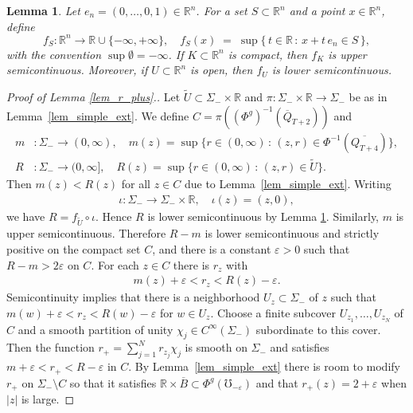 \documentclass[11pt,letterpaper]{amsart}
\newtheorem{Lemma}[Theorem]{Lemma}
\theoremstyle{definition}
\numberwithin{equation}{section}
\newcommand{\ol}[1]{\overline{#1}}
\newcommand{\eps}{\varepsilon}
\def\R{\mathbb R}
\def\mid{\,:\,}
\begin{document}
\begin{Lemma}\label{lem_sc}
Let $e_n = (0, \ldots, 0, 1) \in \mathbb{R}^n$.
For a set $S \subset \mathbb{R}^n$ and a point $x \in \mathbb{R}^n$, define
\[
f_S : \mathbb{R}^n \to \mathbb{R} \cup \{-\infty, +\infty\},
\quad
f_S(x) \;=\; \sup \{\, t \in \mathbb{R} \mid x + t\,e_n \in S \,\},
\]
with the convention $\sup \emptyset = -\infty$.
If $K \subset \mathbb{R}^n$ is compact, then $f_K$ is upper semicontinuous. Moreover, if $U \subset \mathbb{R}^n$ is open, then $f_U$ is lower semicontinuous.
\end{Lemma}
\begin{proof}[Proof of Lemma \ref{lem_r_plus}.]
Let $\tilde U \subset \Sigma_- \times \R$ and $\pi : \Sigma_- \times \R \to \Sigma_-$ be as in Lemma~\ref{lem_simple_ext}.
We define $C = \pi((\Phi^g)^{-1}(\ol Q_{T+2}))$ and
    \begin{align*}
m &: \Sigma_- \to (0,\infty), 
\quad
m(z) = \sup \{ r \in (0, \infty) \mid (z, r) \in \Phi^{-1}(\overline{Q_{T+4}})\},
\\
R &: \Sigma_- \to (0,\infty], \quad R(z) = \sup \{ r \in (0, \infty) \mid (z, r
) \in \tilde U \}.
    \end{align*}
Then $m(z) < R(z)$ for all $z \in C$ due to Lemma~\ref{lem_simple_ext}. 
Writing 
    \begin{align*}
\iota : \Sigma_- \to \Sigma_- \times \R,
\quad \iota(z) = (z, 0),
    \end{align*}
we have $R = f_{\tilde U} \circ \iota$. 
Hence $R$ is lower semicontinuous by Lemma \ref{lem_sc}. Similarly, $m$ is upper semicontinuous.
Therefore $R - m$ is lower semicontinuous and strictly positive on the compact set $C$, and there is a constant $\eps > 0$ such that $R - m > 2\eps$ on $C$. For each $z \in C$ there is $r_z$ with 
    \begin{align*}
m(z) + \eps < r_z < R(z) - \eps.
    \end{align*}
Semicontinuity implies that there is a neighborhood $U_z \subset \Sigma_-$ of $z$ such that $m(w) + \eps < r_z < R(w) - \eps$ for $w \in U_z$. Choose a finite subcover $U_{z_1}, \dots, U_{z_N}$ of $C$ and a smooth partition of unity $\chi_j \in C^\infty(\Sigma_-)$ subordinate to this cover. Then the function $r_+ = \sum_{j=1}^N r_{z_j} \chi_j$ is smooth on $\Sigma_-$ and satisfies $m + \eps < r_+ < R - \eps$ in $C$. By Lemma~\ref{lem_simple_ext} there is room to modify $r_+$ on $\Sigma_- \setminus C$ so that it satisfies $\R \times \overline{B} \subset \Phi^g(\mho_{-\eps})$ and that $r_+(z) = 2 + \eps$ when $|z|$ is large.
\end{proof}
\end{document}
